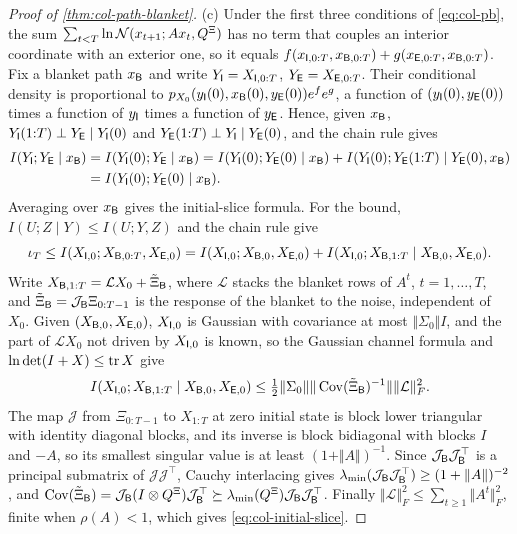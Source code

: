 \begin{proof}[Proof of \cref{thm:col-path-blanket}]
(c) Under the first three conditions of \eqref{eq:col-pb}, the sum $\sum_{t<T}\ln\mathcal{N}(x_{t+1};Ax_t,Q^{\Xi})$ has no term that couples an interior coordinate with an exterior one, so it equals $f(x_{\mathsf{I},0:T},x_{\mathsf{B},0:T})+g(x_{\mathsf{E},0:T},x_{\mathsf{B},0:T})$. Fix a blanket path $x_{\mathsf{B}}$ and write $Y_{\mathsf{I}}=X_{\mathsf{I},0:T}$, $Y_{\mathsf{E}}=X_{\mathsf{E},0:T}$. Their conditional density is proportional to $p_{X_0}(y_{\mathsf{I}}(0),x_{\mathsf{B}}(0),y_{\mathsf{E}}(0))e^{f}e^{g}$, a function of $(y_{\mathsf{I}}(0),y_{\mathsf{E}}(0))$ times a function of $y_{\mathsf{I}}$ times a function of $y_{\mathsf{E}}$. Hence, given $x_{\mathsf{B}}$, $Y_{\mathsf{I}}(1{:}T)\perp Y_{\mathsf{E}}\mid Y_{\mathsf{I}}(0)$ and $Y_{\mathsf{E}}(1{:}T)\perp Y_{\mathsf{I}}\mid Y_{\mathsf{E}}(0)$, and the chain rule gives
\begin{align*}
I(Y_{\mathsf{I}};Y_{\mathsf{E}}\mid x_{\mathsf{B}})&=I(Y_{\mathsf{I}}(0);Y_{\mathsf{E}}\mid x_{\mathsf{B}})=I(Y_{\mathsf{I}}(0);Y_{\mathsf{E}}(0)\mid x_{\mathsf{B}})+I(Y_{\mathsf{I}}(0);Y_{\mathsf{E}}(1{:}T)\mid Y_{\mathsf{E}}(0),x_{\mathsf{B}})\\
&=I(Y_{\mathsf{I}}(0);Y_{\mathsf{E}}(0)\mid x_{\mathsf{B}}).
\end{align*}
Averaging over $x_{\mathsf{B}}$ gives the initial-slice formula. For the bound, $I(U;Z\mid Y)\le I(U;Y,Z)$ and the chain rule give
\[
\iota_T\le I(X_{\mathsf{I},0};X_{\mathsf{B},0:T},X_{\mathsf{E},0})=I(X_{\mathsf{I},0};X_{\mathsf{B},0},X_{\mathsf{E},0})+I(X_{\mathsf{I},0};X_{\mathsf{B},1:T}\mid X_{\mathsf{B},0},X_{\mathsf{E},0}).
\]
Write $X_{\mathsf{B},1:T}=\mathcal LX_0+\tilde\Xi_{\mathsf{B}}$, where $\mathcal L$ stacks the blanket rows of $A^t$, $t=1,\dots,T$, and $\tilde\Xi_{\mathsf{B}}=\mathcal J_{\mathsf{B}}\Xi_{0:T-1}$ is the response of the blanket to the noise, independent of $X_0$. Given $(X_{\mathsf{B},0},X_{\mathsf{E},0})$, $X_{\mathsf{I},0}$ is Gaussian with covariance at most $\Vert\Sigma_0\Vert I$, and the part of $\mathcal LX_0$ not driven by $X_{\mathsf{I},0}$ is known, so the Gaussian channel formula and $\ln\det(I+X)\le\operatorname{tr} X$ give
\[
I(X_{\mathsf{I},0};X_{\mathsf{B},1:T}\mid X_{\mathsf{B},0},X_{\mathsf{E},0})\le\tfrac12\Vert\Sigma_0\Vert\Vert\operatorname{Cov}(\tilde\Xi_{\mathsf{B}})^{-1}\Vert\Vert\mathcal L\Vert_F^2.
\]
The map $\mathcal J$ from $\Xi_{0:T-1}$ to $X_{1:T}$ at zero initial state is block lower triangular with identity diagonal blocks, and its inverse is block bidiagonal with blocks $I$ and $-A$, so its smallest singular value is at least $(1+\Vert A\Vert)^{-1}$. Since $\mathcal J_{\mathsf{B}}\mathcal J_{\mathsf{B}}^\top$ is a principal submatrix of $\mathcal J\mathcal J^\top$, Cauchy interlacing gives $\lambda_{\min}(\mathcal J_{\mathsf{B}}\mathcal J_{\mathsf{B}}^\top)\ge(1+\Vert A\Vert)^{-2}$, and $\operatorname{Cov}(\tilde\Xi_{\mathsf{B}})=\mathcal J_{\mathsf{B}}(I\otimes Q^{\Xi})\mathcal J_{\mathsf{B}}^\top\succeq\lambda_{\min}(Q^{\Xi})\mathcal J_{\mathsf{B}}\mathcal J_{\mathsf{B}}^\top$. Finally $\Vert\mathcal L\Vert_F^2\le\sum_{t\ge1}\Vert A^t\Vert_F^2$, finite when $\rho(A)<1$, which gives \eqref{eq:col-initial-slice}.
\end{proof}

